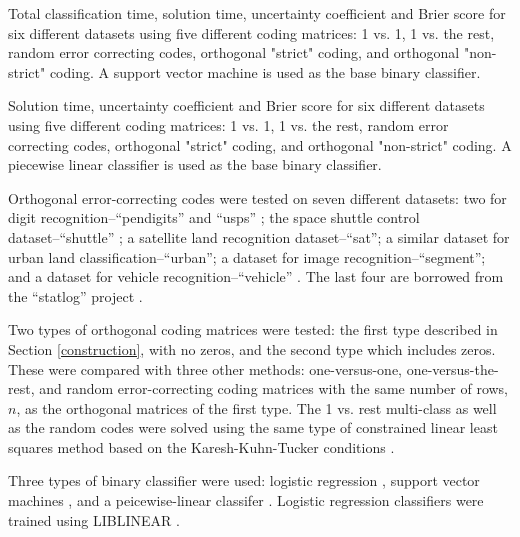 \begin{table*}
\caption{Total classification time, solution time, uncertainty coefficient and Brier score for six different datasets using five different coding matrices: 1 vs. 1, 1 vs. the rest, random error correcting codes, orthogonal "strict" coding, and orthogonal "non-strict" coding. A support vector machine is used as the base binary classifier.}\label{class_results_svm}

\end{table*}

\begin{table*}
\caption{Solution time, uncertainty coefficient and Brier score for six different datasets using five different coding matrices: 1 vs. 1, 1 vs. the rest, random error correcting codes, orthogonal "strict" coding, and orthogonal "non-strict" coding. A piecewise linear classifier is used as the base binary classifier.}\label{class_results_acc}

\end{table*}

Orthogonal error-correcting codes were tested on seven different datasets:
two for digit recognition--``pendigits'' \citep{Alimoglu1996} and
``usps'' \citep{Hull1994}; the space shuttle control dataset--``shuttle''
\citep{King_etal1995}; a satellite land recognition
dataset--``sat''; 
a similar dataset for urban land classification--``urban'';
a dataset for image recognition--``segment'';
and a dataset for vehicle recognition--``vehicle'' \citep{Siebert1987}.
The last four are borrowed from the ``statlog'' project \citep{King_etal1995,Michie_etal1994}.

Two types of orthogonal coding matrices were tested: the first type described in
Section \ref{construction}, with no zeros, and the second type which includes
zeros.
These were compared with three other methods: one-versus-one, one-versus-the-rest,
and random error-correcting coding matrices with the same number of rows, $n$,
as the orthogonal matrices of the first type.
The 1 vs. rest multi-class as well as the random codes were solved using 
the same type of constrained linear least squares method based
on the Karesh-Kuhn-Tucker conditions \citep{Lawson_Hanson1995}.

Three types of binary classifier were used: logistic regression \citep{Michie_etal1994},
support vector machines \citep{Mueller_etal2001},
and a peicewise-linear classifer \citep{Mills2018}.
Logistic regression classifiers were trained using LIBLINEAR \citep{Fan_etal2008}.

